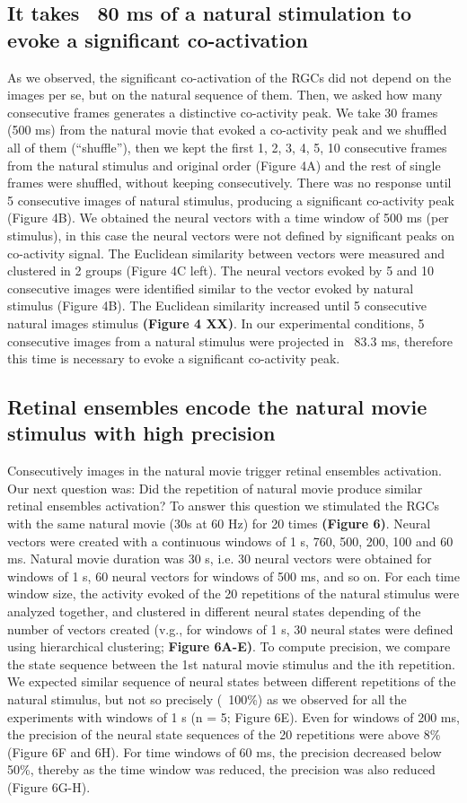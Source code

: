 \documentclass[9pt,twocolumn,twoside,lineno]{pnas-new}
\begin{document}
\subsection*{It takes ~80 ms of a natural stimulation to evoke a significant co-activation}
As we observed, the significant co-activation of the RGCs did not depend on the images per se, but on the natural sequence of them. Then, we asked how many consecutive frames generates a distinctive co-activity peak. We take 30 frames (500 ms) from the natural movie that evoked a co-activity peak and we shuffled all of them (“shuffle”), then we kept the first 1, 2, 3, 4, 5, 10 consecutive frames from the natural stimulus and original order (Figure 4A) and the rest of single frames were shuffled, without keeping consecutively. There was no response until 5 consecutive images of natural stimulus, producing a significant co-activity peak (Figure 4B). We obtained the neural vectors with a time window of 500 ms (per stimulus), in this case the neural vectors were not defined by significant peaks on co-activity signal. The Euclidean similarity between vectors were measured and clustered in 2 groups (Figure 4C left). The neural vectors evoked by 5 and 10 consecutive images were identified similar to the vector evoked by natural stimulus (Figure 4B). The Euclidean similarity increased until 5 consecutive natural images stimulus \textbf{(Figure 4 XX)}. In our experimental conditions, 5 consecutive images from a natural stimulus were projected in ~83.3 ms, therefore this time is necessary to evoke a significant co-activity peak.

\subsection*{Retinal ensembles encode the natural movie stimulus with high precision}
Consecutively images in the natural movie trigger retinal ensembles activation. Our next question was: Did the repetition of natural movie produce similar retinal ensembles activation? To answer this question we stimulated the RGCs with the same natural movie (30s at 60 Hz) for 20 times \textbf{(Figure 6)}. Neural vectors were created with a continuous windows of 1 s, 760, 500, 200, 100 and 60 ms. Natural movie duration was 30 s,  i.e. 30 neural vectors were obtained for windows of 1 s, 60 neural vectors for windows of 500 ms, and so on. For each time window size, the activity evoked of the 20 repetitions of the natural stimulus were analyzed together, and clustered in different neural states depending of the number of vectors created (v.g., for windows of 1 s, 30 neural states were defined using hierarchical clustering; \textbf{Figure 6A-E)}. To compute precision, we compare the state sequence between the 1st natural movie stimulus and the ith repetition. We expected similar sequence of neural states between different repetitions of the natural stimulus, but not so precisely (~100\%) as we observed for all the experiments with windows of 1 s (n = 5; Figure 6E). Even for windows of 200 ms, the precision of the neural state sequences of the 20 repetitions were above 8\% (Figure 6F and 6H). For time windows of 60 ms, the precision decreased below 50\%, thereby as the time window was reduced, the precision was also reduced (Figure 6G-H).
\end{document}
